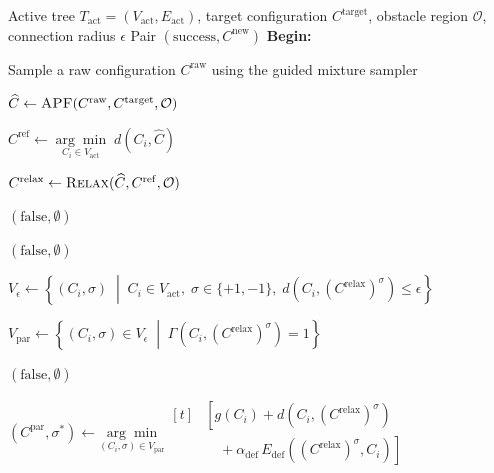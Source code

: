 \documentclass{pas}
\begin{document}
\begin{algorithm}[t]
\small
\caption{Tree Expansion}
\label{alg:gcr_expand}
\begin{algorithmic}[1]
\Require Active tree \(T_{\mathrm{act}}=(V_{\mathrm{act}},E_{\mathrm{act}})\),
target configuration \(C^{\mathrm{target}}\), obstacle region \(\mathcal{O}\),
connection radius \(\epsilon\)
\Ensure Pair \((\mathrm{success},C^{\mathrm{new}})\)
\Statex \textbf{Begin:}

\State Sample a raw configuration \(C^{\mathrm{raw}}\) using the guided mixture sampler

\State \(\widehat{C}\gets
\Call{APF}{C^{\mathrm{raw}},C^{\mathrm{target}},\mathcal{O}}\)

\State \(C^{\mathrm{ref}}\gets
\underset{C_i\in V_{\mathrm{act}}}{\arg\min}\;d(C_i,\widehat{C})\)

\State \(C^{\mathrm{relax}}\gets
\Call{Relax}{\widehat{C},C^{\mathrm{ref}},\mathcal{O}}\)

    \State \Return \((\mathrm{false},\emptyset)\)
\EndIf

    \State \Return \((\mathrm{false},\emptyset)\)
\EndIf

\State \(V_{\epsilon}\gets
\left\{
(C_i,\sigma)
\;\middle|\;
C_i\in V_{\mathrm{act}},\;
\sigma\in\{+1,-1\},\;
d\left(C_i,\left(C^{\mathrm{relax}}\right)^{\sigma}\right)\leq\epsilon
\right\}\)

\State \(V_{\mathrm{par}}\gets
\left\{
(C_i,\sigma)\in V_{\epsilon}
\;\middle|\;
\Gamma\left(C_i,\left(C^{\mathrm{relax}}\right)^{\sigma}\right)=1
\right\}\)

    \State \Return \((\mathrm{false},\emptyset)\)
\EndIf

\State \(
(C^{\mathrm{par}},\sigma^{\ast}) \gets
\underset{(C_i,\sigma)\in V_{\mathrm{par}}}{\arg\min}
\begin{aligned}[t]
&\left[
g(C_i)
+d\left(C_i,\left(C^{\mathrm{relax}}\right)^{\sigma}\right)
\right. \\
&\left.
\quad+\alpha_{\mathrm{def}}\,
E_{\mathrm{def}}\left(
\left(C^{\mathrm{relax}}\right)^{\sigma},C_i
\right)
\right]
\end{aligned}
\)


\end{algorithmic}
\end{algorithm}
\end{document}
